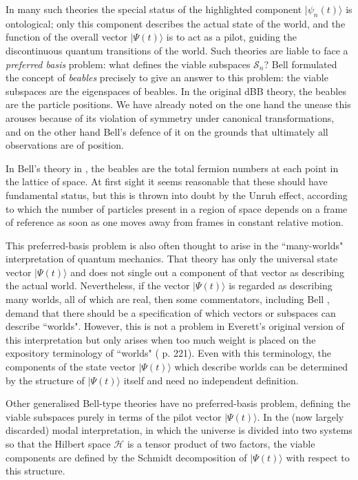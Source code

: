 \documentclass[12pt,reqno]{article}
\renewcommand{\(}{\left(}
\renewcommand{\)}{\right)}
\renewcommand{\.}{\centerdot}
\renewcommand{\S}{\mathcal{S}}
\renewcommand{\H}{\mathcal{H}}
\newcommand{\1}{\mathbf{1}}
\newcommand{\<}{\langle}
\renewcommand{\>}{\rangle}
\theoremstyle{definition}
\theoremstyle{remark}
\numberwithin{equation}{section}
\begin{document}
In many such theories the special status of the highlighted component $|\psi_n(t)\>$ is ontological; only this component describes the actual state of the world, and the function of the overall vector $|\Psi(t)\>$ is to act as a pilot, guiding the discontinuous quantum transitions of the world. Such theories are liable to face a \emph{preferred basis} problem: what defines the viable subspaces $\S_n$? Bell formulated the concept of \emph{beables} precisely to give an answer to this problem: the viable subspaces are the eigenspaces of beables. In the original dBB theory, the beables are the particle positions. We have already noted on the one hand the unease this arouses because of its violation of symmetry under canonical transformations, and on the other hand Bell's defence of it on the grounds that ultimately all observations are of position. %

In Bell's theory in \cite{Bell:beables}, the beables are the total fermion numbers at each point in the lattice of space. At first sight it seems reasonable that these should have fundamental status, but this is thrown into doubt by the Unruh effect, according to which the number of particles present in a region of space depends on a frame of reference as soon as one moves away from frames in constant relative motion.

This preferred-basis problem is also often thought to arise in the ``many-worlds" interpretation of quantum mechanics. That theory has only the universal state vector $|\Psi(t)\>$ and does not single out a component of that vector as describing the actual world. Nevertheless, if the vector $|\Psi(t)\>$ is regarded as describing many worlds, all of which are real, then some commentators, including Bell \cite{Bell:sixworlds}, demand that there should be a specification of which vectors or subspaces can describe ``worlds". However, this is not a problem in Everett's original version \cite{Everett} of this interpretation but only arises when too much weight is placed on the expository terminology of ``worlds" (\cite{QMPN} p. 221). Even with this terminology, the components of the state vector $|\Psi(t)\>$ which describe worlds can be determined by the structure of $|\Psi(t)\>$ itself \cite{Wallace:multiverse} and need no independent definition.

Other generalised Bell-type theories have no preferred-basis problem, defining the viable subspaces purely in terms of the pilot vector $|\Psi(t)\>$. In the (now largely discarded) modal interpretation, in which the universe is divided into two systems so that the Hilbert space $\H$ is a tensor product of two factors, the viable components are defined by the Schmidt decomposition of $|\Psi(t)\>$ with respect to this structure. 
\end{document}
